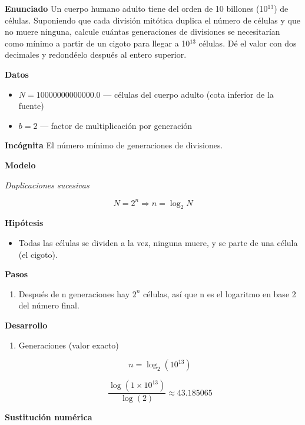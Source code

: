\documentclass{book}
\begin{document}
\begin{tcolorbox}[title={Problema resuelto}, studiumworked, breakable]

\noindent\textbf{Enunciado}
Un cuerpo humano adulto tiene del orden de 10 billones (10\({}^{13}\)) de células. Suponiendo que cada división mitótica duplica el número de células y que no muere ninguna, calcule cuántas generaciones de divisiones se necesitarían como mínimo a partir de un cigoto para llegar a 10\({}^{13}\) células. Dé el valor con dos decimales y redondéelo después al entero superior.


\noindent\textbf{Datos}
\begin{itemize}
\item $N = 10000000000000.0$ — células del cuerpo adulto (cota inferior de la fuente)
\item $b = 2$ — factor de multiplicación por generación
\end{itemize}

\noindent\textbf{Incógnita}
El número mínimo de generaciones de divisiones.


\noindent\textbf{Modelo}

\noindent\textit{Duplicaciones sucesivas}

\[
N = 2^{n} \Rightarrow n = \log_2 N
\]

\noindent\textbf{Hipótesis}
\begin{itemize}
\item Todas las células se dividen a la vez, ninguna muere, y se parte de una célula (el cigoto).
\end{itemize}

\noindent\textbf{Pasos}
\begin{enumerate}
\item
Después de n generaciones hay \(2^n\) células, así que n es el logaritmo en base 2 del número final.

\end{enumerate}

\noindent\textbf{Desarrollo}
\begin{enumerate}
\item
Generaciones (valor exacto)


\[
n = \log_2(10^{13})
\]

\[
\frac{\operatorname{log}\left(1\times 10^{13}\right)}{\operatorname{log}\left(2\right)} \approx 43.185065
\]
\end{enumerate}

\noindent\textbf{Sustitución numérica}


\end{tcolorbox}
\end{document}
